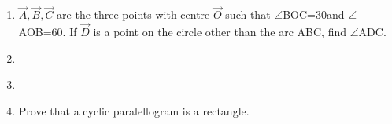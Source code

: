 \begin{enumerate}[label=\thesection.\arabic*,ref=\thesection.\theenumi]
\item  $\vec{A},\vec{B},\vec{C}$ are the three points with centre $\vec{O}$ such that $\angle$BOC=30\degree and $\angle$AOB=60\degree. If $\vec{D}$ is a point on the circle other than the arc ABC, find $\angle$ADC.
\label{chapters/9/10/5/1}
\\
\solution


\item 
\item 
\label{chapters/9/10/5/3}

    \item Prove that a cyclic paralellogram is a rectangle.
\label{chapters/9/10/5/12}
\\
\solution


\end{enumerate}
